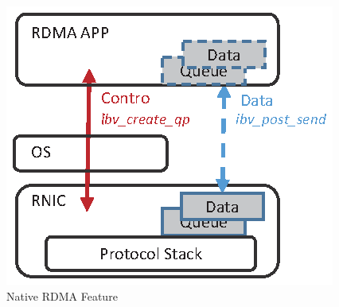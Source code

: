 \begin{figure}[!ht]
	\centering
	\includegraphics[width=1.0\linewidth]{images/rdma-feat.eps}
	\caption{Native RDMA Feature}
	\label{fig:rdma-feat}
\end{figure}


